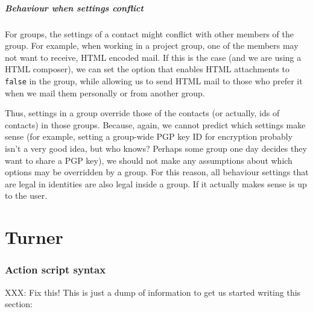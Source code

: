 \documentclass[a4paper]{article}
\begin{document}
\subsubsection{Behaviour when settings conflict}

For groups, the settings of a contact might conflict with other members
of the group.  For example, when working in a project group, one of the
members may not want to receive, HTML encoded mail.  If this is the
case (and we are using a HTML composer), we can set the option that
enables HTML attachments to \texttt{false} in the group, while allowing
us to send HTML mail to those who prefer it when we mail them personally
or from another group.

Thus, settings in a group override those of the contacts (or actually,
ids of contacts) in those groups.  Because, again, we cannot predict
which settings make sense (for example, setting a group-wide PGP key ID for
encryption probably isn't a very good idea, but who knows?  Perhaps some
group one day decides they want to share a PGP key), we should not make any
assumptions about which options may be overridden by a group.
For this reason, all behaviour settings that are legal in identities are
also legal inside a group.  If it actually makes sense is up to the user.

\part{Turner}

\section{Action script syntax}

XXX: Fix this!  This is just a dump of information to get us started writing
this section:
\end{document}
